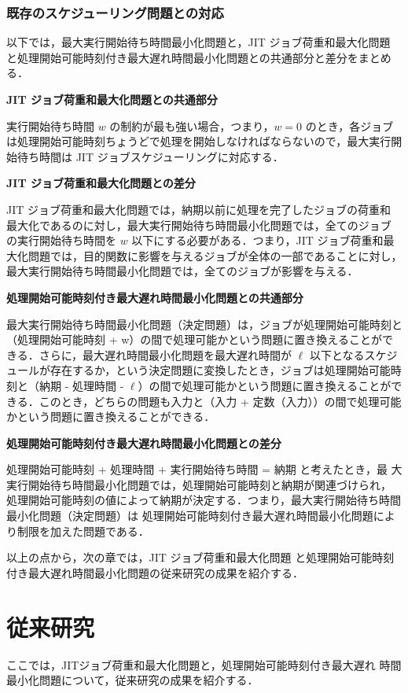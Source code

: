 \documentclass[12pt]{optlab-bachelor}
\begin{document}
\subsection{既存のスケジューリング問題との対応}
以下では，最大実行開始待ち時間最小化問題と，JIT ジョブ荷重和最大化問題
と処理開始可能時刻付き最大遅れ時間最小化問題との共通部分と差分をまとめ
る．

\noindent\textbf{JIT ジョブ荷重和最大化問題との共通部分}

実行開始待ち時間 $w$ の制約が最も強い場合，つまり，$w = 0$ のとき，各ジョブは処理開始可能時刻ちょうどで処理を開始しなければならないので，最大実行開始待ち時間は JIT ジョブスケジューリングに対応する．

\noindent\textbf{JIT ジョブ荷重和最大化問題との差分}

JIT ジョブ荷重和最大化問題では，納期以前に処理を完了したジョブの荷重和
最大化であるのに対し，最大実行開始待ち時間最小化問題では，全てのジョブ
の実行開始待ち時間を $w$ 以下にする必要がある．つまり，JIT ジョブ荷重和最大化問題では，目的関数に影響を与えるジョブが全体の一部であることに対し，最大実行開始待ち時間最小化問題では，全てのジョブが影響を与える．

\noindent\textbf{処理開始可能時刻付き最大遅れ時間最小化問題との共通部分}

最大実行開始待ち時間最小化問題（決定問題）は，ジョブが処理開始可能時刻と（処理開始可能時刻 + w）の間で処理可能かという問題に置き換えることができる．さらに，最大遅れ時間最小化問題を最大遅れ時間が $\ell$ 以下となるスケジュールが存在するか，という決定問題に変換したとき，ジョブは処理開始可能時刻と（納期 - 処理時間 - $\ell$）の間で処理可能かという問題に置き換えることができる．このとき，どちらの問題も入力と（入力 + 定数（入力））の間で処理可能かという問題に置き換えることができる．

\noindent\textbf{処理開始可能時刻付き最大遅れ時間最小化問題との差分}

処理開始可能時刻 + 処理時間 + 実行開始待ち時間 = 納期 と考えたとき，最
大実行開始待ち時間最小化問題では，処理開始可能時刻と納期が関連づけられ，
処理開始可能時刻の値によって納期が決定する．つまり，最大実行開始待ち時間最小化問題（決定問題）は
処理開始可能時刻付き最大遅れ時間最小化問題により制限を加えた問題である．

以上の点から，次の章では，JIT ジョブ荷重和最大化問題
と処理開始可能時刻付き最大遅れ時間最小化問題の従来研究の成果を紹介する．

\chapter{従来研究}\label{c_3}
ここでは，JITジョブ荷重和最大化問題と，処理開始可能時刻付き最大遅れ
時間最小化問題について，従来研究の成果を紹介する．
\end{document}
